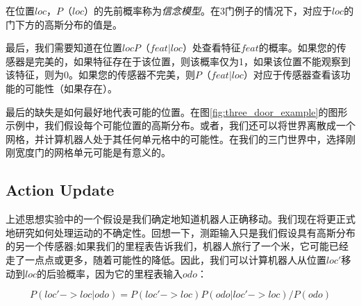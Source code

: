 在位置$loc$，$P（loc）$的先前概率称为\emph{信念模型}。在3门例子的情况下，对应于$loc$的门下方的高斯分布的值是。

最后，我们需要知道在位置$loc$$P（feat|loc）$处查看特征$feat$的概率。如果您的传感器是完美的，如果特征存在于该位置，则该概率仅为1，如果该位置不能观察到该特征，则为0。如果您的传感器不完美，则$P（feat|loc）$对应于传感器查看该功能的可能性（如果存在）。

最后的缺失是如何最好地代表可能的位置。在图\ref{fig:three_door_example}的图形示例中，我们假设每个可能位置的高斯分布。或者，我们还可以将世界离散成一个网格，并计算机器人处于其任何单元格中的可能性。在我们的三门世界中，选择刚刚宽度门的网格单元可能是有意义的。


\subsection {Action Update}
上述思想实验中的一个假设是我们确定地知道机器人正确移动。我们现在将更正式地研究如何处理运动的不确定性。回想一下，测距输入只是我们假设具有高斯分布的另一个传感器;如果我们的里程表告诉我们，机器人旅行了一个米，它可能已经走了一点点或更多，随着可能性的降低。因此，我们可以计算机器人从位置$loc'$移动到$loc$的后验概率，因为它的里程表输入$odo$：

\begin{equation}
P(loc'->loc|odo)=P(loc'->loc)P(odo|loc'->loc)/P(odo)
\end{equation}


